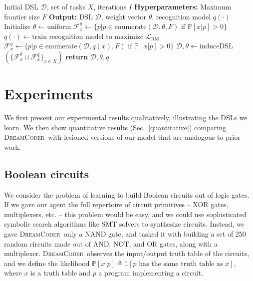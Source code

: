 \documentclass{article}
\newcommand{\system}{\textsc{DreamCoder}~}
\newcommand{\indicator}{\mathds{1}} %
\newcommand{\probability}{\mathds{P}} %
\begin{document}
\begin{algorithm}[tb]
   \caption{The \system Algorithm}
   \label{mainAlgorithm}
   \begin{algorithmic}
      Initial DSL $\mathcal{D}$, set of tasks $X$, iterations $I$
     \STATE \textbf{Hyperparameters:} Maximum frontier size $F$
     \STATE \textbf{Output:} DSL $\mathcal{D}$, weight vector $\theta$, recognition model $q(\cdot)$
     \STATE Initialize $\theta\gets \text{uniform}$ %
     \STATE  $\mathcal{F}^{\theta}_x\gets \{p| p\in \text{enumerate}(\mathcal{D},\theta,F)\text{ if }\probability[x|p] > 0\}$
     \STATE $q(\cdot )\gets \text{train recognition model to maximize }\mathcal{L}_{\text{RM}}$
     \STATE  $\mathcal{F}^{q}_x\gets\{p|p\in \text{enumerate}(\mathcal{D},q(x),F)\text{ if }\probability[x|p] > 0\}$
     \STATE $\mathcal{D},\theta\gets $induceDSL$(\{\mathcal{F}^{\theta}_x\cup\mathcal{F}^{q}_x\}_{x\in X})$
      \ENDFOR
 \STATE \textbf{return} $\mathcal{D},\theta,q$
\end{algorithmic}
\end{algorithm}


\section{Experiments}
We first present our experimental results qualitatively,
illustrating the DSLs we
learn.
We then show quantitative results (Sec.~\ref{quantitative})
comparing \system with lesioned versions
of our model that are analogous to prior work.

\subsection{Boolean circuits}
We consider the problem of learning
to build  Boolean circuits out of logic gates.
If we gave our agent the full repertoire of
circuit primitives -- XOR gates, multiplexers, etc. -- this problem would be easy,
and we could use sophisticated symbolic search algorithms like SMT solvers to synthesize circuits.
Instead, we gave \system only a NAND gate,
and tasked it with building a set of 250 random circuits made out of
AND, NOT, and OR gates, along with a multiplexer.
\system observes the input/output truth table of the circuits,
and we define the likelihood 
$  \probability[x|p]\triangleq\indicator\left[p\text{ has  the same truth table as }x \right]$,
where $x$ is a truth table and $p$ a program implementing a circuit.
\end{document}
